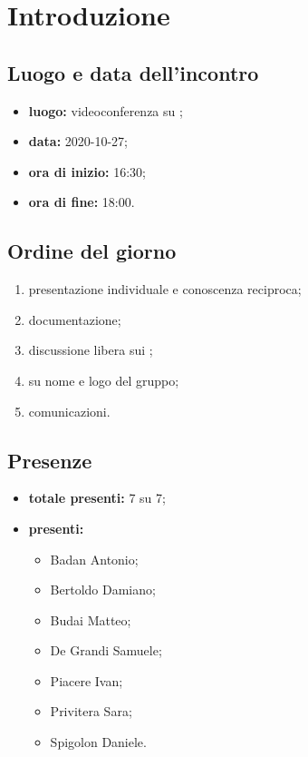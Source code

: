 \section*{Introduzione}

\subsection*{Luogo e data dell'incontro}
\begin{itemize}
	\item \textbf{luogo:} videoconferenza su ;
	\item \textbf{data:} 2020-10-27;
	\item \textbf{ora di inizio:} 16:30;
	\item \textbf{ora di fine:} 18:00.
\end{itemize}

\subsection*{Ordine del giorno}
\begin{enumerate}
\item presentazione individuale e conoscenza reciproca;
\item documentazione;
\item discussione libera sui ;
\item {} su nome e logo del gruppo;
\item comunicazioni.
\end{enumerate}

\subsection*{Presenze}
	\begin{itemize}
		\item \textbf{totale presenti:} 7 su 7;
		\item \textbf{presenti: }
			\begin{itemize}
				\item Badan Antonio;
				\item Bertoldo Damiano;
				\item Budai Matteo;
				\item De Grandi Samuele;
				\item Piacere Ivan;
				\item Privitera Sara;
				\item Spigolon Daniele.
			\end{itemize}
	\end{itemize}

